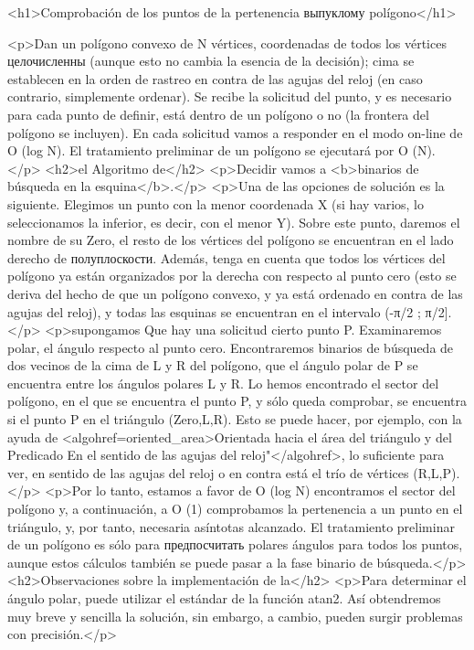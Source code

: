 <h1>Comprobación de los puntos de la pertenencia выпуклому polígono</h1>

<p>Dan un polígono convexo de N vértices, coordenadas de todos los vértices целочисленны (aunque esto no cambia la esencia de la decisión); cima se establecen en la orden de rastreo en contra de las agujas del reloj (en caso contrario, simplemente ordenar). Se recibe la solicitud del punto, y es necesario para cada punto de definir, está dentro de un polígono o no (la frontera del polígono se incluyen). En cada solicitud vamos a responder en el modo on-line de O (log N). El tratamiento preliminar de un polígono se ejecutará por O (N).</p>
<h2>el Algoritmo de</h2>
<p>Decidir vamos a <b>binarios de búsqueda en la esquina</b>.</p>
<p>Una de las opciones de solución es la siguiente. Elegimos un punto con la menor coordenada X (si hay varios, lo seleccionamos la inferior, es decir, con el menor Y). Sobre este punto, daremos el nombre de su Zero, el resto de los vértices del polígono se encuentran en el lado derecho de полуплоскости. Además, tenga en cuenta que todos los vértices del polígono ya están organizados por la derecha con respecto al punto cero (esto se deriva del hecho de que un polígono convexo, y ya está ordenado en contra de las agujas del reloj), y todas las esquinas se encuentran en el intervalo (-π/2 ; π/2].</p>
<p>supongamos Que hay una solicitud cierto punto P. Examinaremos polar, el ángulo respecto al punto cero. Encontraremos binarios de búsqueda de dos vecinos de la cima de L y R del polígono, que el ángulo polar de P se encuentra entre los ángulos polares L y R. Lo hemos encontrado el sector del polígono, en el que se encuentra el punto P, y sólo queda comprobar, se encuentra si el punto P en el triángulo (Zero,L,R). Esto se puede hacer, por ejemplo, con la ayuda de <algohref=oriented_area>Orientada hacia el área del triángulo y del Predicado En el sentido de las agujas del reloj"</algohref>, lo suficiente para ver, en sentido de las agujas del reloj o en contra está el trío de vértices (R,L,P).</p>
<p>Por lo tanto, estamos a favor de O (log N) encontramos el sector del polígono y, a continuación, a O (1) comprobamos la pertenencia a un punto en el triángulo, y, por tanto, necesaria asíntotas alcanzado. El tratamiento preliminar de un polígono es sólo para предпосчитать polares ángulos para todos los puntos, aunque estos cálculos también se puede pasar a la fase binario de búsqueda.</p>
<h2>Observaciones sobre la implementación de la</h2>
<p>Para determinar el ángulo polar, puede utilizar el estándar de la función atan2. Así obtendremos muy breve y sencilla la solución, sin embargo, a cambio, pueden surgir problemas con precisión.</p>
